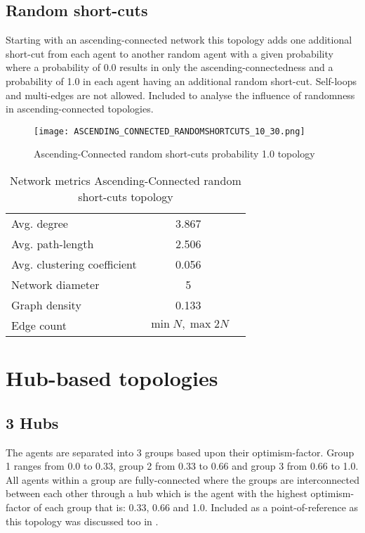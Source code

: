 \documentclass[Bachelorarbeit.tex]{subfiles}
\begin{document}
\subsection{Random short-cuts}
Starting with an ascending-connected network this topology adds one additional short-cut from each agent to another random agent with a given probability where a probability of 0.0 results in only the ascending-connectedness and a probability of 1.0 in each agent having an additional random short-cut. Self-loops and multi-edges are not allowed.
\medskip
Included to analyse the influence of randomness in ascending-connected topologies.

\begin{figure}[H]
	\centering
  \texttt{[image: ASCENDING\_CONNECTED\_RANDOMSHORTCUTS\_10\_30.png]}
	\caption{Ascending-Connected random short-cuts probability 1.0 topology}
	\label{fig:topology_ASCENDING_CONNECTED_RANDOMSHORTCUTS_10_30}
\end{figure}

\begin{table}[h]
	\centering
	\caption{Network metrics Ascending-Connected random short-cuts topology}
	\begin{tabular} { l c r }
		\hline
		Avg. degree & 3.867 \\
		Avg. path-length & 2.506 \\
		Avg. clustering coefficient & 0.056 \\
		Network diameter & 5 \\
		Graph density & 0.133\\
		Edge count & $\min N, \max 2N$ \\
		\hline
	\end{tabular}
\end{table}

\section{Hub-based topologies}
\subsection{3 Hubs}
The agents are separated into 3 groups based upon their optimism-factor. Group 1 ranges from 0.0 to 0.33, group 2 from 0.33 to 0.66 and group 3 from 0.66 to 1.0. All agents within a group are fully-connected where the groups are interconnected between each other through a hub which is the agent with the highest optimism-factor of each group that is: 0.33, 0.66 and 1.0.
\medskip
Included as a point-of-reference as this topology was discussed too in \cite{Breuer2015}.
\end{document}
